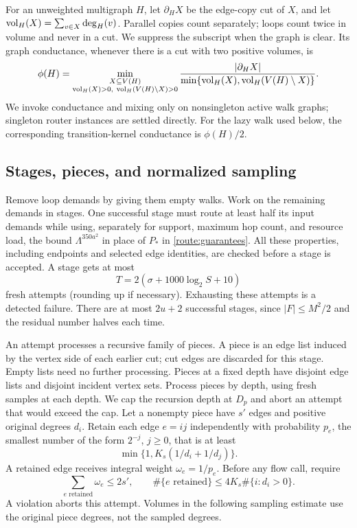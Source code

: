 For an unweighted multigraph $H$, let $\partial_H X$ be the edge-copy cut
of $X$, and let $\operatorname{vol}_H(X)=\sum_{v\in X}\deg_H(v)$.
Parallel copies count separately; loops count twice in volume and never
in a cut.  We suppress the subscript when the graph is clear.  Its graph
conductance, whenever there is a cut with two positive volumes, is
\[
 \phi(H)=\min_{\substack{X\subseteq V(H)\\
                 \operatorname{vol}_H(X)>0,\ \operatorname{vol}_H(V(H)\setminus X)>0}}
 \frac{|\partial_H X|}
      {\min\{\operatorname{vol}_H(X),\operatorname{vol}_H(V(H)\setminus X)\}}.
\]
We invoke conductance and mixing only on nonsingleton active walk graphs;
singleton router instances are settled directly.  For the lazy walk used
below, the corresponding transition-kernel conductance is $\phi(H)/2$.

\subsection{Stages, pieces, and normalized sampling}

Remove loop demands by giving them empty walks.  Work on the remaining
demands in stages.  One successful stage must route at least half its
input demands while using, separately for support, maximum hop count,
and resource load, the bound $\Lambda^{350a^2}$ in place of $P_*$ in
\eqref{route:guarantees}.  All these properties, including endpoints and
selected edge identities, are checked before a stage is accepted.  A
stage gets at most
\begin{equation}\label{route:attempts}
 T=2(\sigma+1000\log_2 S+10)
\end{equation}
fresh attempts (rounding up if necessary).  Exhausting these attempts is
a detected failure.  There are at most $2u+2$ successful stages, since
$|F|\le M^2/2$ and the residual number halves each time.

An attempt processes a recursive family of pieces.  A piece is an edge
list induced by the vertex side of each earlier cut; cut edges are
discarded for this stage.  Empty lists need no further processing.
Pieces at a fixed depth have disjoint edge lists and disjoint incident
vertex sets.  Process pieces by depth, using fresh samples at each
depth.  We cap the recursion depth at $D_p$ and abort an attempt
that would exceed the cap.  Let a nonempty piece have $s'$ edges and
positive original degrees $d_i$.  Retain each edge $e=ij$ independently
with probability $p_e$, the smallest number of the form $2^{-j}$,
$j\ge0$, that is at least
\[
 \min\{1,K_s(1/d_i+1/d_j)\}.
\]
A retained edge receives integral weight $\omega_e=1/p_e$.
Before any flow call, require
\begin{equation}\label{route:sample-checks}
 \sum_{e\text{ retained}}\omega_e\le2s',\qquad
 \#\{e\text{ retained}\}\le4K_s\#\{i:d_i>0\}.
\end{equation}
A violation aborts this attempt.  Volumes in the following sampling
estimate use the original piece degrees, not the sampled degrees.

